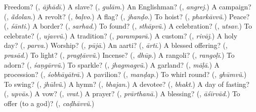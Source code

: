 \begin{tcolorbox}[breakable,colback=teal!4,colframe=teal!35!black,title={Before you move on}]
Freedom? (\textbf{}, \emph{ājhādī}.) A slave? (\textbf{}, \emph{gulām}.) An Englishman? (\textbf{}, \emph{angrej}.) A campaign? (\textbf{}, \emph{ā̃dolan}.) A revolt? (\textbf{}, \emph{baḷvo}.) A flag? (\textbf{}, \emph{jhanḍo}.) To hoist? (\textbf{}, \emph{pharkāvvũ}.) Peace? (\textbf{}, \emph{śānti}.) A border? (\textbf{}, \emph{sarhad}.) To found? (\textbf{}, \emph{sthāpvũ}.) A celebration? (\textbf{}, \emph{utsav}.) To celebrate? (\textbf{}, \emph{ujavvũ}.) A tradition? (\textbf{}, \emph{paramparā}.) A custom? (\textbf{}, \emph{rivāj}.) A holy day? (\textbf{}, \emph{parva}.) Worship? (\textbf{}, \emph{pūjā}.) An aarti? (\textbf{}, \emph{ārtī}.) A blessed offering? (\textbf{}, \emph{prasād}.) To light? (\textbf{}, \emph{pragṭāvvũ}.) Incense? (\textbf{}, \emph{dhūp}.) A rangoli? (\textbf{}, \emph{rangoḷī}.) To adorn? (\textbf{}, \emph{śaṇgārvũ}.) To sparkle? (\textbf{}, \emph{jhagmagvũ}.) A garland? (\textbf{}, \emph{māḷā}.) A procession? (\textbf{}, \emph{śobhāyātrā}.) A pavilion? (\textbf{}, \emph{manḍap}.) To whirl round? (\textbf{}, \emph{ghūmvũ}.) To swing? (\textbf{}, \emph{jhūlvũ}.) A hymn? (\textbf{}, \emph{bhajan}.) A devotee? (\textbf{}, \emph{bhakt}.) A day of fasting? (\textbf{}, \emph{upvās}.) A vow? (\textbf{}, \emph{vrat}.) A prayer? (\textbf{}, \emph{prārthanā}.) A blessing? (\textbf{}, \emph{āśīrvād}.) To offer (to a god)? (\textbf{}, \emph{caḍhāvvũ}.)
\end{tcolorbox}
